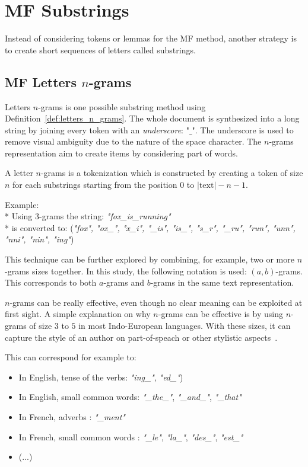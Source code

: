\section{MF Substrings \label{sec:substrings}}

Instead of considering tokens or lemmas for the MF method, another strategy is to create short sequences of letters called substrings.

\subsection{MF Letters $n$-grams}

Letters $n$-grams is one possible substring method using Definition~\ref{def:letters_n_grams}.
The whole document is synthesized into a long string by joining every token with an \textit{underscore}: "$\_$".
The underscore is used to remove visual ambiguity due to the nature of the space character.
The $n$-grams representation aim to create items by considering part of words.

\begin{definition}
  A letter $n$-grams is a tokenization which is constructed by creating a token of size $n$ for each substrings starting from the position $0$ to $|\mathrm{text}| - n - 1$.

  Example: \\*
  Using $3$-grams the string: \textit{"fox\_is\_running"} \\*
  is converted to: (\textit{"fox", "ox\_", "x\_i", "\_is", "is\_", "s\_r", "\_ru", "run", "unn", "nni", "nin", "ing"})
\end{definition}

This technique can be further explored by combining, for example, two or more $n$-grams sizes together.
In this study, the following notation is used: $(a, b)$-grams.
This corresponds to both $a$-grams and $b$-grams in the same text representation.

$n$-grams can be really effective, even though no clear meaning can be exploited at first sight.
A simple explanation on why $n$-grams can be effective is by using $n$-grams of size $3$ to $5$ in most Indo-European languages.
With these sizes, it can capture the style of an author on part-of-speach or other stylistic aspects~\cite{ngrams_authorship}.

This can correspond for example to:
\begin{itemize}
  \item
  In English, tense of the verbs: \textit{"ing\_"}, \textit{"ed\_"})
  \item
  In English, small common words: \textit{"\_the\_"}, \textit{"\_and\_"}, \textit{"\_that"}
  \item
  In French, adverbs : \textit{"\_ment"}
  \item
  In French, small common words : \textit{"\_le"}, \textit{"la\_"}, \textit{"des\_"}, \textit{"est\_"}
  \item
  (...)
\end{itemize}


